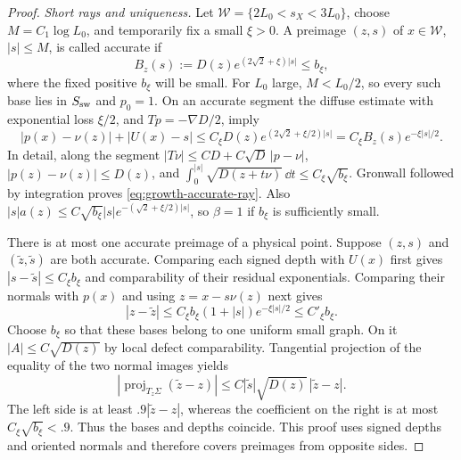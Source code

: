 \begin{proof}
\emph{Short rays and uniqueness.}
Let $\mathcal W=\{2L_0<s_X<3L_0\}$, choose
$M=C_1\log L_0$, and temporarily fix a small $\xi>0$.  A preimage
$(z,s)$ of $x\in\mathcal W$, $|s|\le M$, is called accurate if
\[
 B_z(s):=D(z)e^{(2\sqrt2+\xi)|s|}\le b_\xi,
\]
where the fixed positive $b_\xi$ will be small.  For $L_0$ large,
$M<L_0/2$, so every such base lies in $S_{\rm sw}$ and $p_0=1$.
On an accurate segment the diffuse estimate with exponential loss
$\xi/2$, and $Tp=-\nabla D/2$, imply
\begin{equation}\label{eq:growth-accurate-ray}
 |p(x)-\nu(z)|+|U(x)-s|
 \le C_\xi D(z)e^{(2\sqrt2+\xi/2)|s|}
 =C_\xi B_z(s)e^{-\xi|s|/2}.
\end{equation}
In detail, along the segment
$|T\nu|\le CD+C\sqrt D\,|p-\nu|$,
$|p(z)-\nu(z)|\le D(z)$, and
$\int_0^{|s|}\sqrt{D(z+t\nu)}\,\dd t\le C_\xi\sqrt{b_\xi}$.
Gronwall followed by integration proves
\eqref{eq:growth-accurate-ray}.  Also
$|s|a(z)\le C\sqrt{b_\xi}|s|e^{-(\sqrt2+\xi/2)|s|}$, so
$\beta=1$ if $b_\xi$ is sufficiently small.

There is at most one accurate preimage of a physical point.  Suppose
$(z,s)$ and $(\widetilde z,\widetilde s)$ are both accurate.  Comparing
each signed depth with $U(x)$ first gives
$|s-\widetilde s|\le C_\xi b_\xi$ and comparability of their residual
exponentials.  Comparing their normals with $p(x)$ and using
$z=x-s\nu(z)$ next gives
\[
 |z-\widetilde z|
 \le C_\xi b_\xi(1+|s|)e^{-\xi|s|/2}\le C'_\xi b_\xi.
\]
Choose $b_\xi$ so that these bases belong to one uniform small graph.
On it $|A|\le C\sqrt{D(z)}$ by local defect comparability.  Tangential
projection of the equality of the two normal images yields
\[
 |\operatorname{proj}_{T_z\Sigma}(\widetilde z-z)|
 \le C|\widetilde s|\sqrt{D(z)}\,|\widetilde z-z|.
\]
The left side is at least $.9|\widetilde z-z|$, whereas the coefficient
on the right is at most $C_\xi\sqrt{b_\xi}<.9$.
Thus the bases and depths coincide.  This proof uses signed depths and
oriented normals and therefore covers preimages from opposite sides.


\end{proof}

